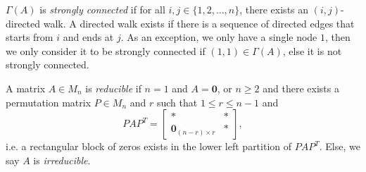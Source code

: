 \begin{definition}
\label{def:strongly-connected}
$\Gamma(A)$ is \textit{strongly connected} if for all $i,j \in \{1,2,\dots,n\}$, there exists an $(i,j)$-directed walk. A directed walk exists if there is a sequence of directed edges that starts from $i$ and ends at $j$. As an exception, we only have a single node $1$, then we only consider it to be strongly connected if $(1,1) \in \Gamma(A)$, else it is not strongly connected.
\end{definition}

\begin{definition}[Reducible]
\label{def:reducible}
A matrix $A \in M_n$ is \textit{reducible} if $n=1$ and $A = \mathbf{0}$, or $n \ge 2$ and there exists a permutation matrix $P \in M_n$ and $r$ such that $1 \le r \le n-1$ and
\[
    PAP^T = \left[
                \begin{array}{c|c}
                * & * \\
                \hline
                \mathbf{0}_{(n-r)\times r} & *
                \end{array}
            \right],
\]
i.e. a rectangular block of zeros exists in the lower left partition of $PAP^T$. Else, we say $A$ is \textit{irreducible}.
\end{definition}

